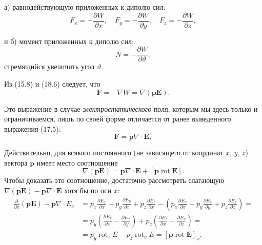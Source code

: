 \documentclass[a4paper,12pt]{article}
\begin{document}
а) равнодействующую приложенных к диполю сил:
\begin{equation}
    F_x = -\frac{\partial W}{\partial x},
    \quad
    F_y = -\frac{\partial W}{\partial y},
    \quad
    F_z = -\frac{\partial W}{\partial z},
    \tag{18.6}
\end{equation}

и б) момент приложенных к диполю сил:
\begin{equation}
    N = -\frac{\partial W}{\partial\vartheta},
    \tag{18.7}
\end{equation}
стремящийся увеличить угол $\vartheta$.

Из (15.8) и (18.6) следует, что
\begin{equation}
    \mathbf{F} = -\nabla W = \nabla(\mathbf{p}\mathbf{E}).
    \tag{18.8}
\end{equation}

Это выражение в случае \textit{электростатического} поля, которым
мы здесь только и ограничиваемся, лишь по своей форме отличается
от ранее выведенного выражения (17.5):
$$
    \mathbf{F} = \mathbf{p}\nabla\cdot\mathbf{E},
$$


Действительно, для всякого постоянного (не зависящего от координат
$x$, $y$, $z$) вектора $\mathbf{p}$ имеет место соотношение
\begin{equation}
    \nabla(\mathbf{p}\mathbf{E}) = \mathbf{p}\nabla\cdot\mathbf{E}
    + [\mathbf{p}\operatorname{rot}\mathbf{E}].
    \tag{18.9}
\end{equation}
Чтобы доказать это соотношение, достаточно рассмотреть слагающую
$\nabla(\mathbf{p}\mathbf{E}) - \mathbf{p}\nabla\cdot\mathbf{E}$ хотя
бы по оси $x$:
\begin{align*}
    \frac{\partial}{\partial x}(\mathbf{p}\mathbf{E}) - \mathbf{p}\nabla\cdot E_x
    &= p_x\frac{\partial E_x}{\partial x}
     + p_y\frac{\partial E_y}{\partial x}
     + p_z\frac{\partial E_z}{\partial x}
     - \left(p_x\frac{\partial E_x}{\partial x}
           + p_y\frac{\partial E_x}{\partial y}
           + p_z\frac{\partial E_x}{\partial z}\right) = \\
    &= p_y\!\left(\frac{\partial E_y}{\partial x} - \frac{\partial E_x}{\partial y}\right)
     + p_z\!\left(\frac{\partial E_z}{\partial x} - \frac{\partial E_x}{\partial z}\right) = \\
    &= p_y\operatorname{rot}_z E - p_z\operatorname{rot}_y E
     = [\mathbf{p}\operatorname{rot}\mathbf{E}]_x.
\end{align*}
\end{document}
